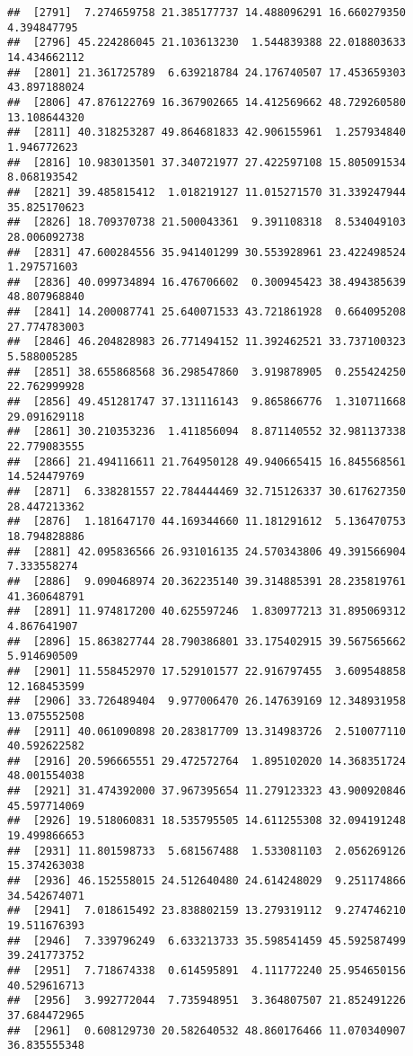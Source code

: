 \documentclass[
]{article}
\begin{document}
\begin{verbatim}
##  [2791]  7.274659758 21.385177737 14.488096291 16.660279350  4.394847795
##  [2796] 45.224286045 21.103613230  1.544839388 22.018803633 14.434662112
##  [2801] 21.361725789  6.639218784 24.176740507 17.453659303 43.897188024
##  [2806] 47.876122769 16.367902665 14.412569662 48.729260580 13.108644320
##  [2811] 40.318253287 49.864681833 42.906155961  1.257934840  1.946772623
##  [2816] 10.983013501 37.340721977 27.422597108 15.805091534  8.068193542
##  [2821] 39.485815412  1.018219127 11.015271570 31.339247944 35.825170623
##  [2826] 18.709370738 21.500043361  9.391108318  8.534049103 28.006092738
##  [2831] 47.600284556 35.941401299 30.553928961 23.422498524  1.297571603
##  [2836] 40.099734894 16.476706602  0.300945423 38.494385639 48.807968840
##  [2841] 14.200087741 25.640071533 43.721861928  0.664095208 27.774783003
##  [2846] 46.204828983 26.771494152 11.392462521 33.737100323  5.588005285
##  [2851] 38.655868568 36.298547860  3.919878905  0.255424250 22.762999928
##  [2856] 49.451281747 37.131116143  9.865866776  1.310711668 29.091629118
##  [2861] 30.210353236  1.411856094  8.871140552 32.981137338 22.779083555
##  [2866] 21.494116611 21.764950128 49.940665415 16.845568561 14.524479769
##  [2871]  6.338281557 22.784444469 32.715126337 30.617627350 28.447213362
##  [2876]  1.181647170 44.169344660 11.181291612  5.136470753 18.794828886
##  [2881] 42.095836566 26.931016135 24.570343806 49.391566904  7.333558274
##  [2886]  9.090468974 20.362235140 39.314885391 28.235819761 41.360648791
##  [2891] 11.974817200 40.625597246  1.830977213 31.895069312  4.867641907
##  [2896] 15.863827744 28.790386801 33.175402915 39.567565662  5.914690509
##  [2901] 11.558452970 17.529101577 22.916797455  3.609548858 12.168453599
##  [2906] 33.726489404  9.977006470 26.147639169 12.348931958 13.075552508
##  [2911] 40.061090898 20.283817709 13.314983726  2.510077110 40.592622582
##  [2916] 20.596665551 29.472572764  1.895102020 14.368351724 48.001554038
##  [2921] 31.474392000 37.967395654 11.279123323 43.900920846 45.597714069
##  [2926] 19.518060831 18.535795505 14.611255308 32.094191248 19.499866653
##  [2931] 11.801598733  5.681567488  1.533081103  2.056269126 15.374263038
##  [2936] 46.152558015 24.512640480 24.614248029  9.251174866 34.542674071
##  [2941]  7.018615492 23.838802159 13.279319112  9.274746210 19.511676393
##  [2946]  7.339796249  6.633213733 35.598541459 45.592587499 39.241773752
##  [2951]  7.718674338  0.614595891  4.111772240 25.954650156 40.529616713
##  [2956]  3.992772044  7.735948951  3.364807507 21.852491226 37.684472965
##  [2961]  0.608129730 20.582640532 48.860176466 11.070340907 36.835555348

\end{verbatim}
\end{document}

